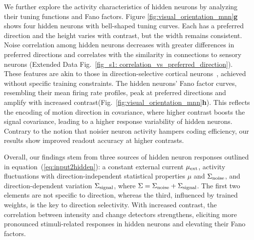 We further explore the activity characteristics of hidden neurons by analyzing their tuning functions and Fano factors.
Figure \ref{fig:visual_orientation_mnn}\textbf{g} shows four hidden neurons with bell-shaped tuning curves.
Each has a preferred direction and the height varies with contrast, but the width remains consistent.
Noise correlation among hidden neurons decreases with greater differences in preferred directions and correlates with the similarity in connections to sensory neurons (Extended Data Fig.~\ref{fig_s1: correlation_vs_preferred_direction}).
These features are akin to those in direction-selective cortical neurons~\cite{Sclar1982, Kohn2005}, achieved without specific training constraints.
The hidden neurons' Fano factor curves, resembling their mean firing rate profiles, peak at preferred directions and amplify with increased contrast(Fig.~\ref{fig:visual_orientation_mnn}\textbf{h}). 
This reflects the encoding of motion direction in covariance, where higher contrast boosts the signal covariance, leading to a higher response variability of hidden neurons.
Contrary to the notion that noisier neuron activity hampers coding efficiency, our results show improved readout accuracy at higher contrasts.

Overall, our findings stem from three sources of hidden neuron responses outlined in equation~(\ref{eq:input2hidden}): a constant external current \(\mu_{\rm ext}\), activity fluctuations with direction-independent statistical properties \(\mu\) and \(\Sigma_{\rm noise}\), and direction-dependent variation \(\Sigma_{\rm signal}\), where \(\Sigma = \Sigma_{\rm noise} + \Sigma_{\rm signal}\). 
The first two elements are not specific to direction, whereas the third, influenced by trained weights, is the key to direction selectivity. 
With increased contrast, the correlation between intensity and change detectors strengthens, eliciting more pronounced stimuli-related responses in hidden neurons and elevating their Fano factors.